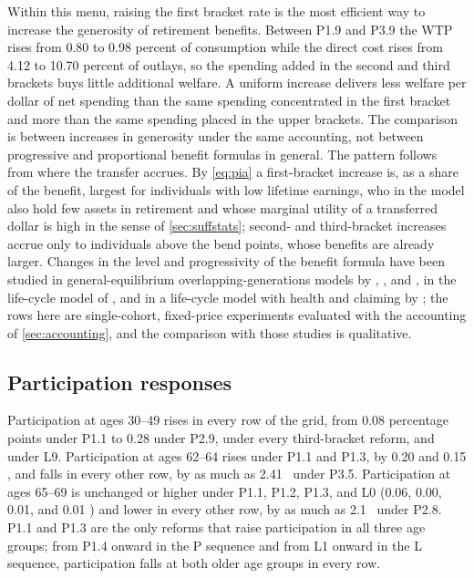 Within this menu, raising the first bracket rate is the most efficient way to increase the generosity of retirement benefits. Between P1.9 and P3.9 the WTP rises from 0.80 to 0.98 percent of consumption while the direct cost rises from 4.12 to 10.70 percent of outlays, so the spending added in the second and third brackets buys little additional welfare. %
A uniform increase delivers less welfare per dollar of net spending than the same spending concentrated in the first bracket and more than the same spending placed in the upper brackets. The comparison is between increases in generosity under the same accounting, not between progressive and proportional benefit formulas in general. The pattern follows from where the transfer accrues. By \eqref{eq:pia} a first-bracket increase is, as a share of the benefit, largest for individuals with low lifetime earnings, who in the model also hold few assets in retirement and whose marginal utility of a transferred dollar is high in the sense of \autoref{sec:suffstats}; second- and third-bracket increases accrue only to individuals above the bend points, whose benefits are already larger. Changes in the level and progressivity of the benefit formula have been studied in general-equilibrium overlapping-generations models by \citet{nishiyama2007does}, \citet{Imrohoroglu2012}, and \citet{kitao2014sustainable}, in the life-cycle model of \citet{huggett2010well}, and in a life-cycle model with health and claiming by \citet{Yu2024}; the rows here are single-cohort, fixed-price experiments evaluated with the accounting of \autoref{sec:accounting}, and the comparison with those studies is qualitative.

\subsection{Participation responses}\label{subsec:ppart}

Participation at ages 30--49 rises in every row of the grid, from 0.08 percentage points under P1.1 to 0.28 under P2.9, under every third-bracket reform, and under L9. %
Participation at ages 62--64 rises under P1.1 and P1.3, by 0.20 and 0.15 \pp, and falls in every other row, by as much as 2.41 \pp\ under P3.5. %
Participation at ages 65--69 is unchanged or higher under P1.1, P1.2, P1.3, and L0 (0.06, 0.00, 0.01, and 0.01 \pp) and lower in every other row, by as much as 2.1 \pp\ under P2.8. %
P1.1 and P1.3 are the only reforms that raise participation in all three age groups; from P1.4 onward in the P sequence and from L1 onward in the L sequence, participation falls at both older age groups in every row. %

